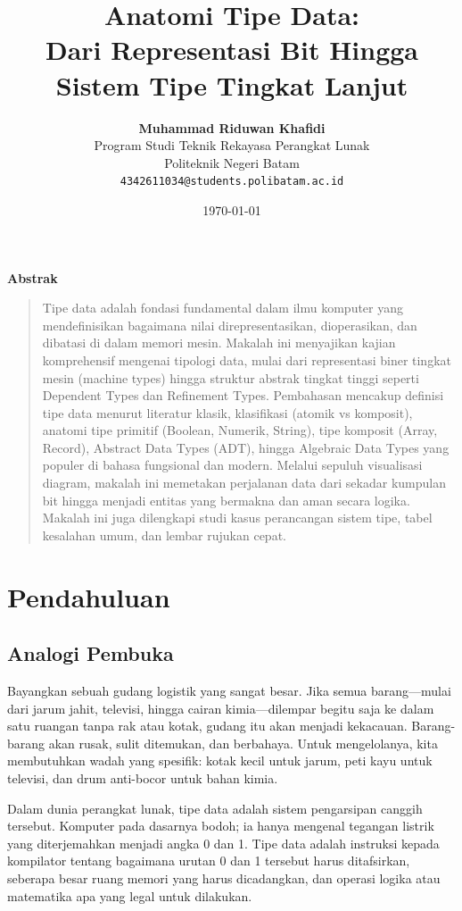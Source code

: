 \documentclass[11pt,a4paper]{article}
\title{\vspace{-1.5cm}\textbf{\sffamily\LARGE Anatomi Tipe Data:\\ Dari Representasi Bit Hingga Sistem Tipe Tingkat Lanjut}}
\author{
	\textbf{Muhammad Riduwan Khafidi} \\
	\small Program Studi Teknik Rekayasa Perangkat Lunak \\
	\small Politeknik Negeri Batam \\
	\small \texttt{4342611034@students.polibatam.ac.id}
}
\date{\small\today}
\renewenvironment{abstract}
{\small
	\begin{center}\textbf{\sffamily Abstrak}\end{center}
	\begin{quote}}
	{\end{quote}}
\begin{document}
	
	\maketitle
	\thispagestyle{empty}
	
	\begin{abstract}
		Tipe data adalah fondasi fundamental dalam ilmu komputer yang mendefinisikan bagaimana nilai direpresentasikan, dioperasikan, dan dibatasi di dalam memori mesin. Makalah ini menyajikan kajian komprehensif mengenai tipologi data, mulai dari representasi biner tingkat mesin (machine types) hingga struktur abstrak tingkat tinggi seperti Dependent Types dan Refinement Types. Pembahasan mencakup definisi tipe data menurut literatur klasik, klasifikasi (atomik vs komposit), anatomi tipe primitif (Boolean, Numerik, String), tipe komposit (Array, Record), Abstract Data Types (ADT), hingga Algebraic Data Types yang populer di bahasa fungsional dan modern. Melalui sepuluh visualisasi diagram, makalah ini memetakan perjalanan data dari sekadar kumpulan bit hingga menjadi entitas yang bermakna dan aman secara logika. Makalah ini juga dilengkapi studi kasus perancangan sistem tipe, tabel kesalahan umum, dan lembar rujukan cepat.
	\end{abstract}
	
	\section{Pendahuluan}
	
	\subsection{Analogi Pembuka}
	
	Bayangkan sebuah gudang logistik yang sangat besar. Jika semua barang—mulai dari jarum jahit, televisi, hingga cairan kimia—dilempar begitu saja ke dalam satu ruangan tanpa rak atau kotak, gudang itu akan menjadi kekacauan. Barang-barang akan rusak, sulit ditemukan, dan berbahaya. Untuk mengelolanya, kita membutuhkan wadah yang spesifik: kotak kecil untuk jarum, peti kayu untuk televisi, dan drum anti-bocor untuk bahan kimia.
	
	Dalam dunia perangkat lunak, tipe data adalah sistem pengarsipan canggih tersebut. Komputer pada dasarnya bodoh; ia hanya mengenal tegangan listrik yang diterjemahkan menjadi angka 0 dan 1. Tipe data adalah instruksi kepada kompilator tentang bagaimana urutan 0 dan 1 tersebut harus ditafsirkan, seberapa besar ruang memori yang harus dicadangkan, dan operasi logika atau matematika apa yang legal untuk dilakukan.
	
\end{document}
